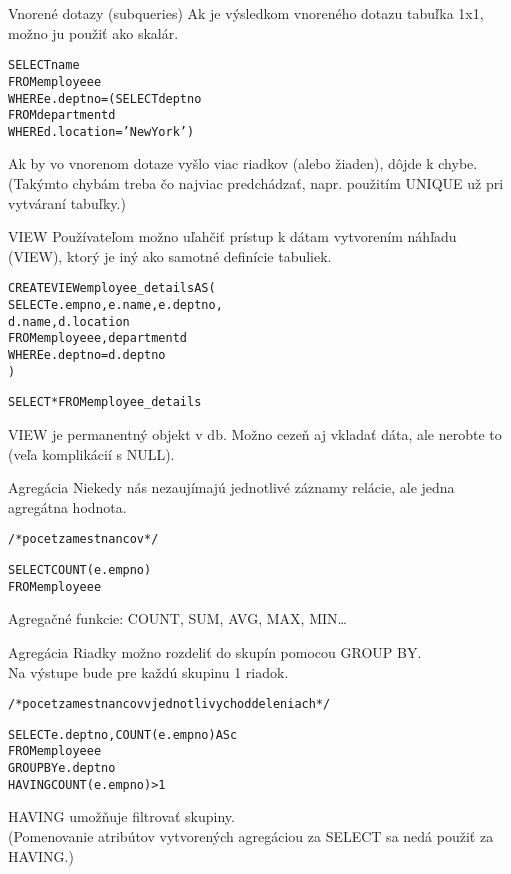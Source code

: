 \documentclass[12pt]{beamer}
\def\blue#1{\textcolor{Cerulean}{#1}}
\begin{document}
\begin{frame}[fragile]{Vnorené dotazy (subqueries)}
Ak je výsledkom vnoreného dotazu tabuľka 1x1, možno ju použiť ako skalár.
\begin{alltt}
SELECT name
FROM employee e
WHERE \alert{e.deptno =} \blue{(SELECT deptno
                  FROM department d
                  WHERE d.location = 'New York')}
\end{alltt}
Ak by vo vnorenom dotaze vyšlo viac riadkov (alebo žiaden), dôjde k chybe.\\
(Takýmto chybám treba čo najviac predchádzať, napr. použitím UNIQUE už pri vytváraní tabuľky.)
\end{frame}

\begin{frame}[fragile]{VIEW}
Používateľom možno uľahčiť prístup k dátam vytvorením náhľadu (VIEW), ktorý je iný ako samotné definície tabuliek.
\begin{alltt}
\alert{CREATE VIEW} \blue{employee_details} AS (
    SELECT e.empno, e.name, e.deptno,
           d.name, d.location
    FROM employee e, department d
    WHERE e.deptno = d.deptno
)

SELECT * FROM \blue{employee_details}
\end{alltt}
VIEW je permanentný objekt v db. Možno cezeň aj vkladať dáta, ale nerobte to (veľa komplikácií s NULL).
\end{frame}

\begin{frame}[fragile]{Agregácia}
Niekedy nás nezaujímajú jednotlivé záznamy relácie, ale jedna agregátna hodnota.
\begin{alltt}
/* pocet zamestnancov */

SELECT \alert{COUNT}(e.empno)
FROM employee e
\end{alltt}
Agregačné funkcie: COUNT, SUM, AVG, MAX, MIN\dots
\end{frame}

\begin{frame}[fragile]{Agregácia}
Riadky možno rozdeliť do skupín pomocou \alert{GROUP BY}.\\
Na výstupe bude pre každú skupinu 1 riadok.
\begin{alltt}
/* pocet zamestnancov v jednotlivych oddeleniach */

SELECT e.deptno, \alert{COUNT}(e.empno) AS c
FROM employee e
\alert{GROUP BY} e.deptno
\blue{HAVING} COUNT(e.empno) > 1
\end{alltt}
\bigskip
\blue{HAVING} umožňuje filtrovať skupiny.\\
(Pomenovanie atribútov vytvorených agregáciou za SELECT sa nedá použiť za \blue{HAVING}.)
\end{frame}
\end{document}
